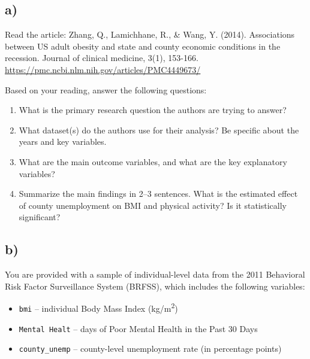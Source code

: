 \documentclass[12pt]{article}
\begin{document}
\subsection*{a)}

Read the article: Zhang, Q., Lamichhane, R., \& Wang, Y. (2014). Associations between US adult obesity and state and county economic conditions in the recession. Journal of clinical medicine, 3(1), 153-166.\\
\href{https://pmc.ncbi.nlm.nih.gov/articles/PMC4449673/}{https://pmc.ncbi.nlm.nih.gov/articles/PMC4449673/}

\vspace{0.3cm}

Based on your reading, answer the following questions:

\begin{enumerate}
    \item What is the primary research question the authors are trying to answer?
    \item What dataset(s) do the authors use for their analysis? Be specific about the years and key variables.
    \item What are the main outcome variables, and what are the key explanatory variables?
    \item Summarize the main findings in 2--3 sentences. What is the estimated effect of county unemployment on BMI and physical activity? Is it statistically significant?
\end{enumerate}

\subsection*{b)}

You are provided with a sample of individual-level data from the 2011 Behavioral Risk Factor Surveillance System (BRFSS), which includes the following variables:

\begin{itemize}
    \item \texttt{bmi} -- individual Body Mass Index (kg/m\textsuperscript{2})
    \item \texttt{Mental Healt} -- days of Poor Mental Health in the Past 30 Days
    \item \texttt{county\_unemp} -- county-level unemployment rate (in percentage points)
\end{itemize}

\vspace{0.3cm}
\end{document}
